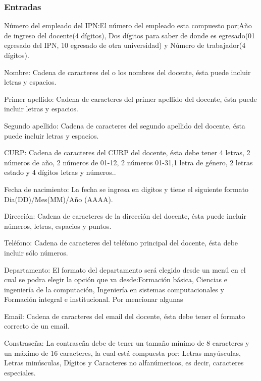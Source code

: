 \subsubsection{Entradas}
	\begin{Citemize}
		\item Número del empleado del IPN:El número del empleado esta compuesto por;Año de ingreso del docente(4 dígitos), Dos dígitos para saber de donde es egresado(01 egresado del IPN, 10 egresado de otra universidad) y Número de trabajador(4 dígitos).
		\item Nombre: Cadena de caracteres del o los nombres del docente, ésta puede incluir letras y espacios. 
		\item Primer apellido: Cadena de caracteres del primer apellido del docente, ésta puede incluir letras y espacios. 
		\item Segundo apellido: Cadena de caracteres del segundo apellido del docente, ésta puede incluir letras y espacios. 
		\item CURP: Cadena de caracteres del CURP del docente, ésta debe tener 4 letras, 2 números de año, 2 números de 01-12, 2 números 01-31,1 letra de género, 2 letras estado y 4 dígitos letras y números.. 
		\item Fecha de nacimiento: La fecha se ingresa en digitos y tiene el siguiente formato Dia(DD)/Mes(MM)/Año (AAAA).
		\item Dirección: Cadena de caracteres de la dirección del docente, ésta puede incluir números, letras, espacios y puntos. 
		\item Teléfono: Cadena de caracteres del teléfono principal del docente, ésta debe incluir sólo números. 
		\item Departamento: El formato del departamento será elegido desde un menú en el cual se podra elegir la opción que va desde:Formación básica, Ciencias e ingeniería de la computación, Ingeniería en sistemas computacionales y Formación integral e institucional. Por mencionar algunas
		\item Email: Cadena de caracteres del email del docente, ésta debe tener el formato correcto de un email. 
		\item Constraseña: La contraseña debe de tener un tamaño mínimo de 8 caracteres y un máximo de 16 caracteres, la cual está compuesta por: Letras mayúsculas, Letras minúsculas, Dígitos y Caracteres no alfanúmericos, es decir, caracteres especiales.

	\end{Citemize}
